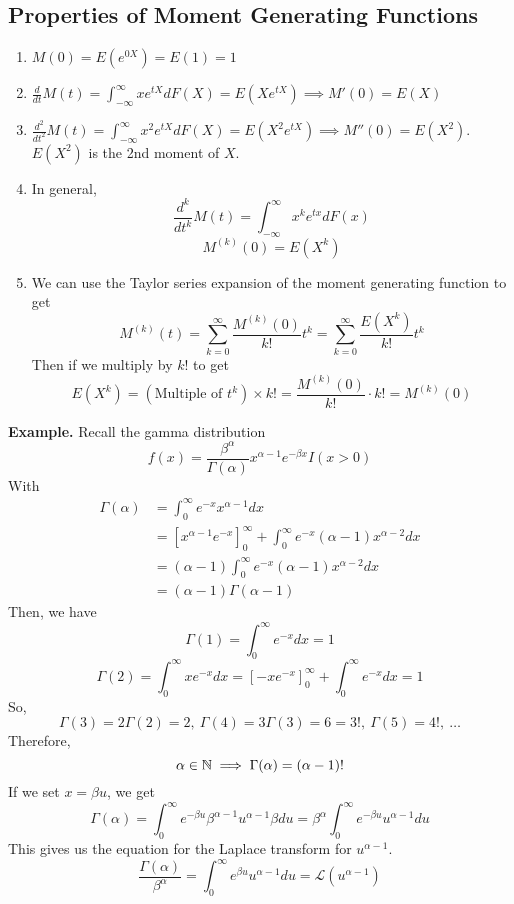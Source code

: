 \documentclass[openany]{report}
\begin{document}
\subsection{Properties of Moment Generating Functions}
\begin{enumerate}[label=(\roman*)]
    \item $M(0) = E(e^{0X}) = E(1) = 1$
    \item $\frac{d}{dt} M(t) = \int_{-\infty}^\infty xe^{tX}dF(X) = E(Xe^{tX}) \implies M'(0) = E(X)$
    \item $\frac{d^2}{dt^2} M(t) = \int_{-\infty}^\infty x^2e^{tX}dF(X) = E(X^2e^{tX}) \implies M''(0) = E(X^2)$. $E(X^2)$ is the 2nd moment of $X$.
    \item In general, 
    \[\frac{d^k}{dt^k} M(t) = \int_{-\infty}^\infty x^ke^{tx}dF(x)\]
    \[M^{(k)}(0) = E(X^k)\]
    \item We can use the Taylor series expansion of the moment generating function to get 
    \[M^{(k)}(t) = \sum_{k=0}^\infty \frac{M^{(k)}(0)}{k!}t^k = \sum_{k=0}^\infty \frac{E(X^k)}{k!}t^k\]
    Then if we multiply by $k!$ to get 
    \[E(X^k) = (\text{Multiple of $t^k$}) \times k! = \frac{M^{(k)}(0)}{k!} \cdot k! = M^{(k)}(0)\]
\end{enumerate}
\noindent
\textbf{Example.} Recall the gamma distribution 
\[f(x) = \frac{\beta^\alpha}{\Gamma(\alpha)}x^{\alpha-1}e^{-\beta x}I(x > 0)\]
With 
\begin{align*}
    \Gamma(\alpha) &= \int_0^\infty e^{-x}x^{\alpha-1}dx\\ 
    &= \left[x^{\alpha -1}e^{-x}\right]_0^{\infty} + \int_0^\infty e^{-x}(\alpha - 1)x^{\alpha -2}dx\\ 
    &= (\alpha - 1)\int_0^\infty e^{-x}(\alpha - 1)x^{\alpha -2}dx\\
    &= (\alpha - 1)\Gamma(\alpha - 1)
\end{align*}
Then, we have 
\[\Gamma(1) = \int_0^\infty e^{-x}dx = 1\]
\[\Gamma(2) = \int_0^\infty xe^{-x}dx = \left[-xe^{-x}\right]_0^\infty + \int_0^\infty e^{-x}dx = 1\]
So, 
\[\Gamma(3) = 2\Gamma(2) = 2, \ \Gamma(4) = 3 \Gamma(3) = 6 = 3!, \ \Gamma(5) = 4!, \ \ldots\]
Therefore,
\[\alpha \in \mathbb{N} \implies \Gamma(\alpha) = (\alpha-1)!\]
If we set $x = \beta u$, we get 
\[\Gamma(\alpha) = \int_0^\infty e^{-\beta u}\beta^{\alpha -1}u^{\alpha-1}\beta du = \beta^\alpha \int_0^\infty e^{-\beta u}u^{\alpha -1}du\]
This gives us the equation for the Laplace transform for $u^{\alpha -1}$. 
\[\frac{\Gamma(\alpha)}{\beta^\alpha} = \int_0^\infty e^{\beta u}u^{\alpha - 1}du = \mathcal{L}(u^{\alpha -1})\]
\end{document}
